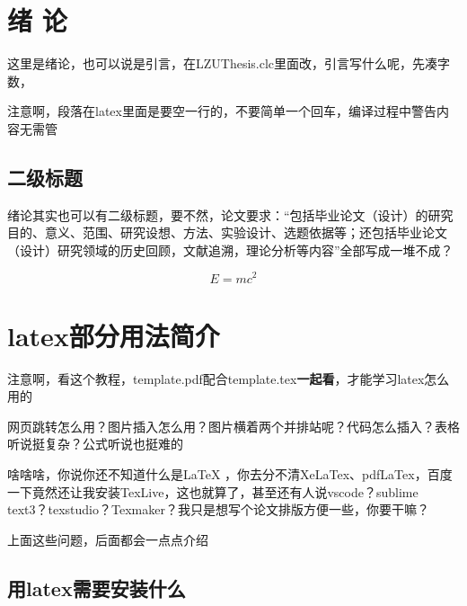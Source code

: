\documentclass[AutoFakeBold]{LZUThesis}
\begin{document}
\mainmatter

\chapter{\texorpdfstring{绪 \quad 论}{绪论}}


这里是绪论，也可以说是引言，在LZUThesis.clc里面改，引言写什么呢，先凑字数，

注意啊，段落在latex里面是要空一行的，不要简单一个回车，编译过程中警告内容无需管

\section{二级标题}

绪论其实也可以有二级标题，要不然，论文要求：“包括毕业论文（设计）的研究目的、意义、范围、研究设想、方法、实验设计、选题依据等；还包括毕业论文（设计）研究领域的历史回顾，文献追溯，理论分析等内容”全部写成一堆不成？

\begin{equation}
    E=mc^2
\end{equation}

\chapter{latex部分用法简介}

注意啊，看这个教程，template.pdf配合template.tex\textbf{一起看}，才能学习latex怎么用的

网页跳转怎么用？图片插入怎么用？图片横着两个并排站呢？代码怎么插入？表格听说挺复杂？公式听说也挺难的

啥啥啥，你说你还不知道什么是LaTeX ，你去分不清XeLaTex、pdfLaTex，百度一下竟然还让我安装TexLive，这也就算了，甚至还有人说vscode？sublime text3？texstudio？Texmaker？我只是想写个论文排版方便一些，你要干嘛？

上面这些问题，后面都会一点点介绍

\section{用latex需要安装什么}
\end{document}
